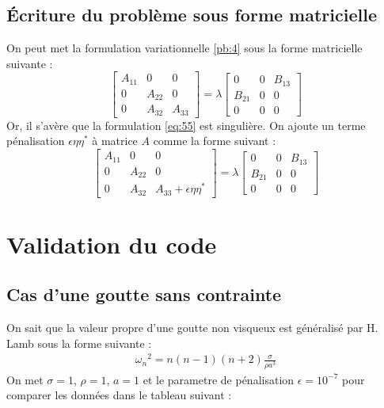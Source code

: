 \documentclass[a4paper]{report}
\begin{document}
\subsection{Écriture du problème sous forme matricielle}
On peut met la formulation variationnelle \eqref{pb:4} sous la forme matricielle suivante :
\begin{equation}\label{eq:55}
\begin{bmatrix}
A_{11} & 0      & 0 \\
0      & A_{22} & 0 \\
0      & A_{32} & A_{33}
\end{bmatrix}
=
\lambda
\begin{bmatrix}
0      & 0 & B_{13} \\
B_{21} & 0 & 0 \\
0      & 0 & 0
\end{bmatrix}
\end{equation}
Or, il s'avère que la formulation \eqref{eq:55} est singulière. On ajoute un terme pénalisation $\epsilon \eta \eta^*$ à matrice $A$ comme la forme suivant :
\begin{equation}\label{eq:5}
\begin{bmatrix}
A_{11} & 0      & 0 \\
0      & A_{22} & 0 \\
0      & A_{32} & A_{33} + \epsilon \eta \eta^*
\end{bmatrix}
=
\lambda
\begin{bmatrix}
0      & 0 & B_{13} \\
B_{21} & 0 & 0 \\
0      & 0 & 0
\end{bmatrix}
\end{equation}
\newpage
\section{Validation du code}
\subsection{Cas d'une goutte sans contrainte}
On sait que la valeur propre d'une goutte non visqueux est généralisé par H. Lamb sous la forme suivante :
\begin{eqnarray*}
{\omega_n}^2 = n (n-1) (n+2) \frac{\sigma}{\rho a^3}
\end{eqnarray*}
On met $\sigma = 1$, $\rho = 1$, $a = 1$ et le parametre de pénalisation $\epsilon = 10^{-7}$ pour comparer les données dans le tableau suivant :
\end{document}
